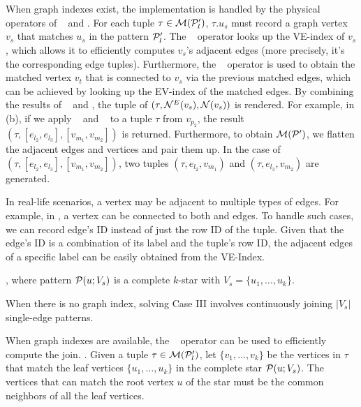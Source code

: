 When graph indexes exist, the implementation is handled by the physical operators of \expandedge~ and \getvertex. For each tuple $\tau \in \mathcal{M}(\mathcal{P}'_l)$, $\tau.u_s$ must record a graph vertex $v_s$ that matches $u_s$ in the pattern $\mathcal{P}'_l$. The \expandedge~ operator looks up the VE-index of $v_s$, which allows it to efficiently computes $v_s$'s adjacent edges (more precisely, it's the corresponding edge tuples). Furthermore, the \getvertex~ operator is used to obtain the matched vertex $v_t$ that is connected to $v_s$ via the previous matched edges, which can be achieved by looking up the EV-index of the matched edges.
By combining the results of \expandedge~ and \getvertex, the tuple of $(\tau, {\mathcal{N}}^E(v_s), {\mathcal{N}}(v_s))$ is rendered. For example, in (b), if we apply \expandedge~ and \getvertex~ to a tuple $\tau$ from $v_{p_2}$, the result $(\tau, [e_{l_2}, e_{l_3}], [v_{m_1}, v_{m_2}])$ is returned.
Furthermore, to obtain $\mathcal{M}(\mathcal{P}')$, we flatten the adjacent edges and vertices and pair them up. In the case of $(\tau, [e_{l_2}, e_{l_3}], [v_{m_1}, v_{m_2}])$, two tuples $(\tau, e_{l_2}, v_{m_1})$ and $(\tau, e_{l_3}, v_{m_2})$ are generated.

In real-life scenarios, a vertex may be adjacent to multiple types of edges. For example, in , a  vertex can be connected to both  and  edges. To handle such cases, we can record edge's ID instead of just the row ID of the tuple. Given that the edge's ID is a combination of its label and the tuple's row ID, the adjacent edges of a specific label can be easily obtained from the VE-Index.

, where pattern $\mathcal{P}(u;V_s)$ is a complete $k$-star with $V_s = \{u_1, \ldots, u_k\}$. %

When there is no graph index, solving Case III involves continuously joining $|V_s|$ single-edge patterns.

When graph indexes are available, the \expandintersect~ operator can be used to efficiently compute the join.
.
Given a tuple $\tau \in \mathcal{M}(\mathcal{P}'_l)$, let $\{v_1, \ldots, v_k\}$ be the vertices in $\tau$ that match the leaf vertices $\{u_1, \ldots, u_k\}$ in the complete star $\mathcal{P}(u;V_s)$. The vertices that can match the root vertex $u$ of the star must be the common neighbors of all the leaf vertices.

